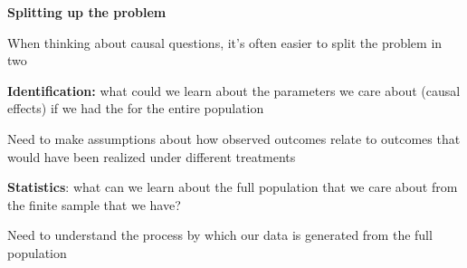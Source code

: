 \documentclass[11pt, aspectratio=169]{beamer}
\newenvironment{wideitemize}{\itemize\addtolength{\itemsep}{5pt}}{\enditemize}
\begin{document}
\begin{frame}{\bf \large Splitting up the problem}
	\begin{wideitemize}
		
		\item
		When thinking about causal questions, it's often easier to split the problem in two
		
		\item
		\textbf{Identification:} what could we learn about the parameters we care about (causal effects) if we had the  for the entire population
		\begin{wideitemize}
			\item 
			Need to make assumptions about how observed outcomes relate to outcomes that would have been realized under different treatments
		\end{wideitemize}
		
		\item
		\textbf{Statistics}: what can we learn about the full population that we care about from the finite sample that we have?
			\begin{wideitemize}
				\item 
				Need to understand the process by which our data is generated from the full population
			\end{wideitemize} 	
		
	\end{wideitemize}	
	
\end{frame}
\end{document}
